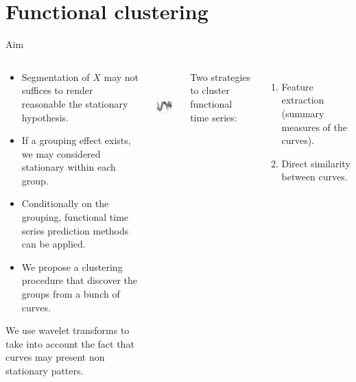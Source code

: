 \documentclass[xcolor=dvipsnames, smaller]{beamer}
\begin{document}

\section{Functional clustering}

\begin{frame}{Aim}

\begin{columns}
  \begin{block}{ }
    \begin{itemize}
      \item Segmentation of $X$ may not suffices to render reasonable 
            the stationary hypothesis.
      \item If a grouping effect exists, we may considered stationary within each group. 
      \item Conditionally on the grouping, functional time series prediction methods 
            can be applied.
      \item We propose a clustering procedure that discover the groups from a bunch
             of curves.
    \end{itemize}

    We use wavelet transforms to take into account the fact 
    that curves may  present non stationary patters.
  \end{block}

    \includegraphics[width=0.9\textwidth,
                             height=2.7cm]{pics/conso-traj.png}

   Two strategies to cluster functional time series:
   \begin{enumerate}
     \item Feature extraction (summary measures of the curves).
     \item Direct similarity between curves.
   \end{enumerate}  

\end{columns}
\end{frame}

\end{document}
